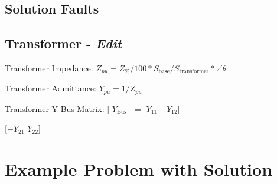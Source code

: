 \documentclass{article}
\begin{document}
	\subsection{Solution Faults}
	
	
	\subsection{Transformer - \textit{Edit}}
	\noindent
	Transformer Impedance: $Z_{pu} = Z_\% / 100 * S_{\text{base}} / S_{\text{transformer}} * \angle{\theta}$
	
	\noindent
	Transformer Admittance: $Y_{pu} = 1 / Z_{pu}$
	
	\noindent
	Transformer Y-Bus Matrix: [ $Y_{\text{Bus}}$ ] = [$Y_{11}$ $-Y_{12}$]
	
	\noindent
	[$-Y_{21}$ $Y_{22}$]
	
	\section{Example Problem with Solution}
	
\end{document}
